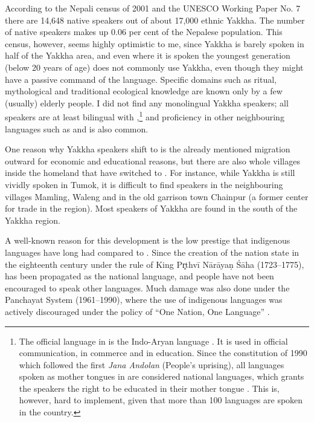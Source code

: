 According to the Nepali census of 2001 \citep{CBS2001Report} and the UNESCO Working Paper No. 7 \citep{Toba2005Unesco}  there are 14,648 native speakers out of about 17,000 ethnic Yakkha. The number of native speakers makes up 0.06 per cent of the Nepalese population. This census, however, seems highly optimistic to me, since Yakkha is barely spoken in half of the Yakkha area, and even where it is spoken the youngest generation (below 20 years of age) does not commonly use Yakkha, even though they might have a passive command of the language. Specific domains such as ritual, mythological and traditional ecological knowledge are known only by a few (usually) elderly people. I did not find any monolingual Yakkha speakers; all speakers are at least bilingual with ,\footnote{The official language in  is the Indo-Aryan language . It is used in official communication,  in commerce and in  education. Since the constitution of 1990 which followed the first \emph{Jana Andolan} (People's uprising), all languages spoken as mother tongues in  are considered national languages, which grants the speakers the right to be educated in their mother tongue \citep{Turin2007_Diversity}. This is, however, hard to implement, given that more than 100 languages are spoken in the country.} and proficiency in other neighbouring languages such as  and  is also common.

One reason why Yakkha  speakers shift to  is the already mentioned migration outward for economic and educational reasons, but there are also whole  villages inside the  homeland that have switched to . For instance, while Yakkha is still vividly spoken in Tumok, it is difficult to find speakers in the neighbouring villages Mamling, Waleng and in the old garrison town Chainpur (a former center for trade in the region). Most speakers of Yakkha are found in the south of the Yakkha region.

A well-known reason for this development is the low prestige that indigenous languages have long  had compared to . Since the creation of the  nation state in the eighteenth century under the rule of King Pr̥thvī Nārāyaṇ Śāha (1723–1775),  has been propagated as the national language, and people have  not been encouraged to speak other languages. Much damage was also done under the Panchayat System (1961–1990), where the use of indigenous languages was actively discouraged under the policy of “One Nation, One Language” \citep[20]{Toba2005Unesco}.

